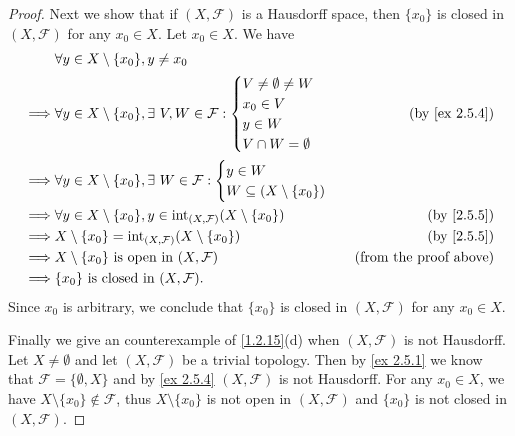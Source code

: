 \begin{proof}
  Next we show that if \((X, \mathcal{F})\) is a Hausdorff space, then \(\{x_0\}\) is closed in \((X, \mathcal{F})\) for any \(x_0 \in X\).
  Let \(x_0 \in X\).
  We have
  \begin{align*}
             & \forall y \in X \setminus \{x_0\}, y \neq x_0                                                                               \\
    \implies & \forall y \in X \setminus \{x_0\}, \exists\ V, W \in \mathcal{F} : \begin{cases}
                                                                                    V \neq \emptyset \neq W \\
                                                                                    x_0 \in V               \\
                                                                                    y \in W                 \\
                                                                                    V \cap W = \emptyset
                                                                                  \end{cases}            & \text{(by \cref{ex 2.5.4})}     \\
    \implies & \forall y \in X \setminus \{x_0\}, \exists\ W \in \mathcal{F} : \begin{cases}
                                                                                 y \in W \\
                                                                                 W \subseteq (X \setminus \{x_0\})
                                                                               \end{cases}                            \\
    \implies & \forall y \in X \setminus \{x_0\}, y \in \text{int}_{(X, \mathcal{F})}(X \setminus \{x_0\}) & \text{(by \cref{2.5.5})}      \\
    \implies & X \setminus \{x_0\} = \text{int}_{(X, \mathcal{F})}(X \setminus \{x_0\})                    & \text{(by \cref{2.5.5})}      \\
    \implies & X \setminus \{x_0\} \text{ is open in } (X, \mathcal{F})                                    & \text{(from the proof above)} \\
    \implies & \{x_0\} \text{ is closed in } (X, \mathcal{F}).
  \end{align*}
  Since \(x_0\) is arbitrary, we conclude that \(\{x_0\}\) is closed in \((X, \mathcal{F})\) for any \(x_0 \in X\).

  Finally we give an counterexample of \cref{1.2.15}(d) when \((X, \mathcal{F})\) is not Hausdorff.
  Let \(X \neq \emptyset\) and let \((X, \mathcal{F})\) be a trivial topology.
  Then by \cref{ex 2.5.1} we know that \(\mathcal{F} = \{\emptyset, X\}\) and by \cref{ex 2.5.4} \((X, \mathcal{F})\) is not Hausdorff.
  For any \(x_0 \in X\), we have \(X \setminus \{x_0\} \notin \mathcal{F}\), thus \(X \setminus \{x_0\}\) is not open in \((X, \mathcal{F})\) and \(\{x_0\}\) is not closed in \((X, \mathcal{F})\).
\end{proof}

